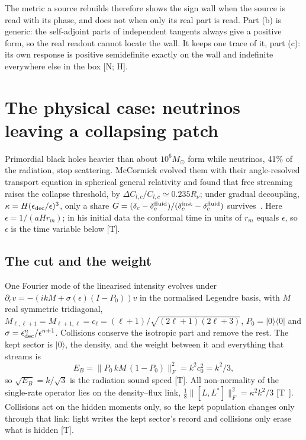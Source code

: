 \documentclass[11pt]{article}
\theoremstyle{definition}
\newcommand{\grade}[1]{\textsf{\small[#1]}}
\newcommand{\F}[1]{\lVert #1\rVert_F}
\begin{document}
The metric a source rebuilds therefore shows the sign wall when the source is read with its phase, and does not when only its real part is read. Part (b) is generic: the self-adjoint parts of independent tangents always give a positive form, so the real readout cannot locate the wall. It keeps one trace of it, part (c): its own response is positive semidefinite exactly on the wall and indefinite everywhere else in the box \grade{N; H}.

\section{The physical case: neutrinos leaving a collapsing patch}\label{sec:nu}

Primordial black holes heavier than about $10^6M_\odot$ form while neutrinos, 41\% of the radiation, stop scattering. McCormick evolved them with their angle-resolved transport equation in spherical general relativity and found that free streaming raises the collapse threshold, by $\Delta C_{l,c}/C_{l,c}\simeq0.235R_\nu$; under gradual decoupling, $\kappa=H(\epsilon_{\rm dec}/\epsilon)^3$, only a share $G=(\delta_c-\delta_c^{\rm fluid})/(\delta_c^{\rm inst}-\delta_c^{\rm fluid})$ survives~\cite{McC}. Here $\epsilon=1/(aHr_m)$; in his initial data the conformal time in units of $r_m$ equals $\epsilon$, so $\epsilon$ is the time variable below \grade{T}.

\subsection{The cut and the weight}

One Fourier mode of the linearised intensity evolves under $\partial_\epsilon v=-(ikM+\sigma(\epsilon)(I-P_0))v$ in the normalised Legendre basis, with $M$ real symmetric tridiagonal, $M_{\ell,\ell+1}=M_{\ell+1,\ell}=c_\ell=(\ell+1)/\sqrt{(2\ell+1)(2\ell+3)}$, $P_0=|0\rangle\langle0|$ and $\sigma=\epsilon_{\rm dec}^n/\epsilon^{n+1}$. Collisions conserve the isotropic part and remove the rest. The kept sector is $|0\rangle$, the density, and the weight between it and everything that streams is
\begin{equation}
E_B=\F{P_0\,kM\,(1-P_0)}^2=k^2c_0^2=k^2/3,
\end{equation}
so $\sqrt{E_B}=k/\sqrt3$ is the radiation sound speed \grade{T}. All non-normality of the single-rate operator lies on the density--flux link, $\tfrac18\F{[L,L^\ast]}^2=\kappa^2k^2/3$ \grade{T~\cite{NL,CE}}. Collisions act on the hidden moments only, so the kept population changes only through that link: light writes the kept sector's record and collisions only erase what is hidden \grade{T}.
\end{document}
